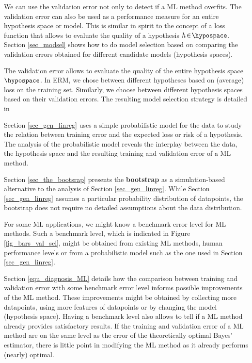 \documentclass[12pt]{report}
\begin{document}
We can use the validation error not only to detect if a ML method overfits. 
The validation error can also be used as a performance measure 
for an entire hypothesis space or model. This is similar in spirit to the concept 
of a loss function that allows to evaluate the quality of a hypothesis $h\!\in\!\hypospace$. 
Section \ref{sec_modsel} shows how to do model selection based on comparing 
the validation errors obtained for different candidate models (hypothesis spaces). 

The validation error allows to evaluate the quality of the entire hypothesis 
space $\hypospace$. In ERM, we chose between different 
hypotheses based on (average) loss on the training set. Similarly, we 
choose between different hypothesis spaces based on their validation errors. 
The resulting model selection strategy is detailed in

Section \ref{sec_gen_linreg} uses a simple probabilistic model for the 
data to study the relation between training error and the expected loss 
or risk of a hypothesis. The analysis of the probabilistic model reveals the 
interplay between the data, the hypothesis space and the resulting training 
and validation error of a ML method. 

Section \ref{sec_the_bootsrap} presents the {\bf bootstrap} as a simulation-based 
alternative to the analysis of Section \ref{sec_gen_linreg}. While Section \ref{sec_gen_linreg} 
assumes a particular probability distribution of datapoints, the bootstrap does 
not require no detailed assumptions about the data distribution. 

For some ML applications, we might know a benchmark error level for 
ML methods. Such a benchmark level, which is indicated in Figure \ref{fig_bars_val_sel}, 
might be obtained from existing ML methods, human performance levels or 
from a probabilistic model such as the one used in Section \ref{sec_gen_linreg}.

Section \ref{equ_diagnosis_ML} details how the comparison between training and 
validation error with some benchmark error level informs possible improvements 
of the ML method. These improvements might be obtained by collecting more datapoints, 
using more features of datapoints or by changing the model (hypothesis space). 
Having a benchmark level also allows to tell if a ML method already provides 
satisfactory results. If the training and validation error of a ML method are on 
the same level as the error of the theoretically optimal Bayes' estimator, there is 
little point in modifying the ML method as it already performs (nearly) optimal. 
\end{document}
